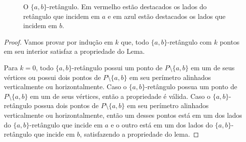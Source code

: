 \begin{figure}
    \caption{O $\{a,b\}$-retângulo. Em vermelho estão destacados os lados do retângulo que incidem em $a$ e em azul estão destacados os lados que incidem em $b$.}
\end{figure}

\begin{proof}

    Vamos provar por indução em $k$ que, todo $\{a,b\}$-retângulo com $k$ pontos em seu interior satisfaz a propriedade do Lema.

    Para $k = 0$, todo $\{a,b\}$-retângulo possui um ponto de $P \setminus \{a,b\}$ em um de seus vértices ou possui dois pontos de $P \setminus \{a,b\}$ em seu perímetro alinhados verticalmente ou horizontalmente. Caso o $\{a,b\}$-retângulo possua um ponto de $P \setminus \{a,b\}$ em um de seus vértices, então a propriedade é válida. Caso o $\{a,b\}$-retângulo possua dois pontos de $P \setminus \{a,b\}$ em seu perímetro alinhados verticalmente ou horizontalmente, então um desses pontos está em um dos lados do $\{a,b\}$-retângulo que incide em $a$ e o outro está em um dos lados do $\{a,b\}$-retângulo que incide em $b$, satisfazendo a propriedade do lema.


\end{proof}
